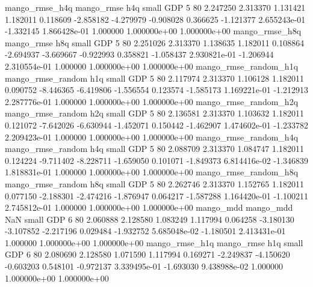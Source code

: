        mango_rmse_h4q        mango_rmse                  h4q      small      GDP                 5 80 2.247250       2.313370 1.131421       1.182011    0.118609     -2.858182     -4.279979    -0.908028       0.366625 -1.121377 2.655243e-01    -1.332145   1.866428e-01            1.000000    1.000000e+00        1.000000e+00
       mango_rmse_h8q        mango_rmse                  h8q      small      GDP                 5 80 2.251026       2.313370 1.138635       1.182011    0.108864     -2.694937     -3.669667    -0.922993       0.358821 -1.058437 2.930821e-01    -1.206944   2.310554e-01            1.000000    1.000000e+00        1.000000e+00
mango_rmse_random_h1q mango_rmse_random                  h1q      small      GDP                 5 80 2.117974       2.313370 1.106128       1.182011    0.090752     -8.446365     -6.419806    -1.556554       0.123574 -1.585173 1.169221e-01    -1.212913   2.287776e-01            1.000000    1.000000e+00        1.000000e+00
mango_rmse_random_h2q mango_rmse_random                  h2q      small      GDP                 5 80 2.136581       2.313370 1.103632       1.182011    0.121072     -7.642026     -6.630944    -1.452071       0.150442 -1.462907 1.474602e-01    -1.233782   2.209423e-01            1.000000    1.000000e+00        1.000000e+00
mango_rmse_random_h4q mango_rmse_random                  h4q      small      GDP                 5 80 2.088709       2.313370 1.084747       1.182011    0.124224     -9.711402     -8.228711    -1.659050       0.101071 -1.849373 6.814416e-02    -1.346839   1.818831e-01            1.000000    1.000000e+00        1.000000e+00
mango_rmse_random_h8q mango_rmse_random                  h8q      small      GDP                 5 80 2.262746       2.313370 1.152765       1.182011    0.077150     -2.188301     -2.474216    -1.876947       0.064217 -1.587288 1.164420e-01    -1.100211   2.745812e-01            1.000000    1.000000e+00        1.000000e+00
            mango_mdd         mango_mdd                  NaN      small      GDP                 6 80 2.060888       2.128580 1.083249       1.117994    0.064258     -3.180130     -3.107852    -2.217196       0.029484 -1.932752 5.685048e-02    -1.180501   2.413431e-01            1.000000    1.000000e+00        1.000000e+00
       mango_rmse_h1q        mango_rmse                  h1q      small      GDP                 6 80 2.080690       2.128580 1.071590       1.117994    0.169271     -2.249837     -4.150620    -0.603203       0.548101 -0.972137 3.339495e-01    -1.693030   9.438988e-02            1.000000    1.000000e+00        1.000000e+00
